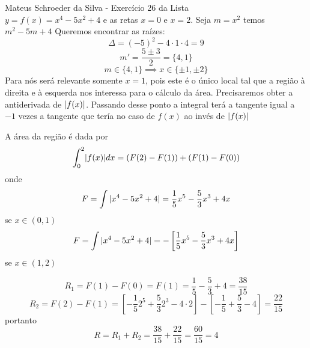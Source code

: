 \documentclass{article}
\begin{document}
    Mateus Schroeder da Silva - Exercício 26 da Lista\\
    $y = f(x) = x^4-5x^2+4$ e as retas $x=0$ e $x=2$.
    Seja $m=x^2$ temos
    $m^2-5m+4$ Queremos encontrar as raízes:
    $$\Delta = (-5)^2-4 \cdot 1 \cdot 4 = 9 $$
    $$m' = \dfrac{5 \pm 3}{2} = \{ 4,1 \} $$
    $$ m \in \{ 4,1 \} \implies x \in \{ \pm 1, \pm 2 \} $$
    Para nós será relevante somente $x = 1$, pois este é o único local tal que a região à direita e à esquerda nos interessa para o cálculo da área. Precisaremos obter a antiderivada de $ \lvert  f(x)  \rvert$. Passando desse ponto a integral terá a tangente igual a $-1$ vezes a tangente que tería no caso de $f(x)$ ao invés de $\lvert f(x) \rvert$

    A área da região é dada por 
    $$ \int_0^2 \lvert f(x) \rvert dx = ( F(2) - F(1) ) + ( F(1) - F(0) )$$ onde 
    $$ F = \int {\lvert x^4 - 5x^2 + 4 \rvert } = \dfrac{1}{5} x^5 - \dfrac{5}{3} x^3 + 4x $$ se $x \in (0,1) $
    $$ F = \int {\lvert x^4 - 5x^2 + 4 \rvert } = -\left[ \dfrac{1}{5} x^5 - \dfrac{5}{3} x^3 + 4x \right] $$ se $x \in (1,2) $

    $$R_1 = F(1) - F(0) = F(1) = \dfrac{1}{5} - \dfrac{5}{3} + 4 = \dfrac{38}{15} $$
    $$R_2= F(2) - F(1) = \left[ -\dfrac{1}{5} 2^5 + \dfrac{5}{3} 2^3 - 4 \cdot 2 \right] - \left[ - \dfrac{1}{5} +\dfrac{5}{3} - 4 \right] = \dfrac{22}{15}$$
    portanto
    $$R = R_1 + R_2 = \dfrac{38}{15} + \dfrac{22}{15} = \dfrac{60}{15} = 4 $$
\end{document}
